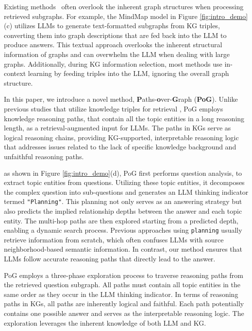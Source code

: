 Existing methods~\cite{mindmapwen2023, guo2023gpt4graph, chen2024exploring} often overlook the inherent graph structures when processing retrieved subgraphs.
For example, the MindMap model in Figure \ref{fig:intro_demo}(c) utilizes LLMs to generate text-formatted subgraphs from KG triples, converting them into graph descriptions that are fed back into the LLM to produce answers. This textual approach overlooks the inherent structural information of graphs and can overwhelm the LLM when dealing with large graphs. Additionally, during KG information selection, most methods use in-context learning by feeding triples into the LLM, ignoring the overall graph structure.


 In this paper, we introduce a novel method, \textbf{P}aths-\textbf{o}ver-\textbf{G}raph (\textbf{PoG}). Unlike previous studies that utilize knowledge triples for retrieval \cite{tog1.0sun2023think,tog2.0ma2024think}, PoG employs knowledge reasoning paths,
that contain all the topic entities in a long reasoning length,
as a retrieval-augmented input for LLMs. The paths in KGs serve as logical reasoning chains, providing KG-supported, interpretable reasoning logic that addresses issues related to the lack of specific knowledge background and unfaithful reasoning paths.

 as shown in Figure \ref{fig:intro_demo}(d), PoG first performs question analysis, to extract topic entities from questions. Utilizing these topic entities, it decomposes the complex question into sub-questions and generates an LLM thinking indicator termed \texttt{"Planning"}.
This planning not only serves as an answering
strategy but also predicts the implied relationship depths between the answer and each topic entity. 
The multi-hop paths are then explored starting from a predicted depth, enabling a dynamic search process. 
Previous approaches using \texttt{planning} usually retrieve information from scratch, which often confuses LLMs with source neighborhood-based semantic information. In contrast, our method ensures that LLMs follow accurate reasoning paths that directly lead to the answer.
% 


PoG employs a three-phase exploration process to traverse reasoning paths from the retrieved question subgraph. All paths must contain all topic entities in the same order as they occur in the LLM thinking indicator. 
In terms of reasoning paths in KGs, all paths are inherently logical and faithful. Each path potentially contains one possible answer and serves as the interpretable reasoning logic.  The exploration leverages the inherent knowledge of both  LLM and KG.

